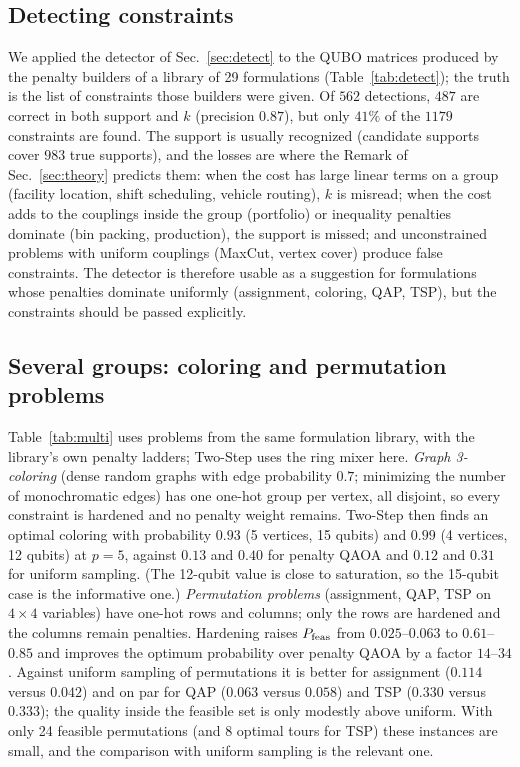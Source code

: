 \subsection{Detecting constraints}

We applied the detector of Sec.~\ref{sec:detect} to the QUBO matrices produced by the penalty builders of a library of 29 formulations (Table~\ref{tab:detect}); the truth is the list of constraints those builders were given.
Of $562$ detections, $487$ are correct in both support and $k$ (precision $0.87$), but only $41\%$ of the $1179$ constraints are found.
The support is usually recognized (candidate supports cover $983$ true supports), and the losses are where the Remark of Sec.~\ref{sec:theory} predicts them: when the cost has large linear terms on a group (facility location, shift scheduling, vehicle routing), $k$ is misread; when the cost adds to the couplings inside the group (portfolio) or inequality penalties dominate (bin packing, production), the support is missed; and unconstrained problems with uniform couplings (MaxCut, vertex cover) produce false constraints.
The detector is therefore usable as a suggestion for formulations whose penalties dominate uniformly (assignment, coloring, QAP, TSP), but the constraints should be passed explicitly.

\subsection{Several groups: coloring and permutation problems}

Table~\ref{tab:multi} uses problems from the same formulation library, with the library's own penalty ladders; Two-Step uses the ring mixer here.
\emph{Graph 3-coloring} (dense random graphs with edge probability $0.7$; minimizing the number of monochromatic edges) has one one-hot group per vertex, all disjoint, so every constraint is hardened and no penalty weight remains.
Two-Step then finds an optimal coloring with probability $0.93$ (5 vertices, 15 qubits) and $0.99$ (4 vertices, 12 qubits) at $p=5$, against $0.13$ and $0.40$ for penalty QAOA and $0.12$ and $0.31$ for uniform sampling. (The 12-qubit value is close to saturation, so the 15-qubit case is the informative one.)
\emph{Permutation problems} (assignment, QAP, TSP on $4\times4$ variables) have one-hot rows and columns; only the rows are hardened and the columns remain penalties. Hardening raises $P_{\rm feas}$ from $0.025$--$0.063$ to $0.61$--$0.85$ and improves the optimum probability over penalty QAOA by a factor $14$--$34$. Against uniform sampling of permutations it is better for assignment ($0.114$ versus $0.042$) and on par for QAP ($0.063$ versus $0.058$) and TSP ($0.330$ versus $0.333$); the quality inside the feasible set is only modestly above uniform. With only 24 feasible permutations (and 8 optimal tours for TSP) these instances are small, and the comparison with uniform sampling is the relevant one.
